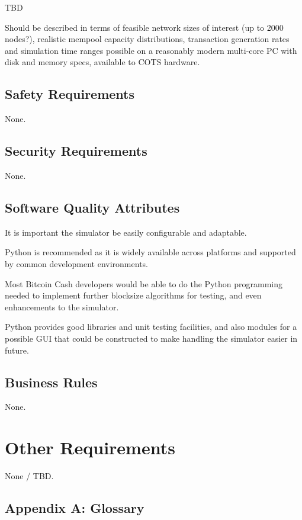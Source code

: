 \documentclass{scrreprt}
\begin{document}
    TBD

    Should be described in terms of feasible network sizes of interest (up to
    2000 nodes?), realistic mempool capacity distributions,
    transaction generation rates and simulation time ranges possible on a
    reasonably modern multi-core PC with disk and memory specs,
    available to COTS hardware.

  \section{Safety Requirements}

    None.

  \section{Security Requirements}

    None.

  \section{Software Quality Attributes}

    It is important the simulator be easily configurable and adaptable.

    Python is recommended as it is widely available across platforms and
    supported by common development environments.

    Most Bitcoin Cash developers would be able to do the Python programming
    needed to implement further blocksize algorithms for testing, and even
    enhancements to the simulator.

    Python provides good libraries and unit testing facilities, and also
    modules for a possible GUI that could be constructed to make handling
    the simulator easier in future.

  \section{Business Rules}

    None.

\chapter{Other Requirements}

  None / TBD.

  \section{Appendix A: Glossary}
\end{document}

